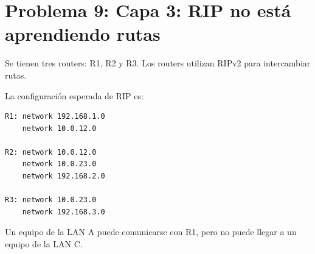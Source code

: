 \section{Problema 9: Capa 3: RIP no está aprendiendo rutas}

\begin{tcolorbox}[enunciado]
Se tienen tres routers: R1, R2 y R3. Los routers utilizan RIPv2 para intercambiar rutas.

\vspace{10pt}
\begin{center}
\end{center}
\vspace{10pt}

La configuración esperada de RIP es:

\vspace{10pt}
\begin{center}
\begin{minipage}{5.5cm}
\begin{verbatim}
R1: network 192.168.1.0
    network 10.0.12.0

R2: network 10.0.12.0
    network 10.0.23.0
    network 192.168.2.0

R3: network 10.0.23.0
    network 192.168.3.0
\end{verbatim}
\end{minipage}
\end{center}
\vspace{10pt}

Un equipo de la LAN A puede comunicarse con R1, pero no puede llegar a un equipo de la LAN C.


\end{tcolorbox}
